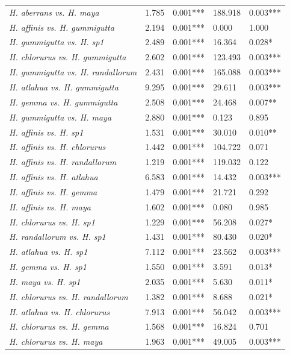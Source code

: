 \begin{xltabular}{\textwidth}{p{4.5cm}*{4}{X}}
\emph{H. aberrans vs. H. maya} & 1.785 & 0.001*** & 188.918 & 0.003*** \\
\emph{H. affinis vs. H. gummigutta} & 2.194 & 0.001*** & 0.000 & 1.000 \\
\emph{H. gummigutta vs. H. sp1} & 2.489 & 0.001*** & 16.364 & 0.028* \\
\emph{H. chlorurus vs. H. gummigutta} & 2.602 & 0.001*** & 123.493 & 0.003*** \\
\emph{H. gummigutta vs. H. randallorum} & 2.431 & 0.001*** & 165.088 & 0.003*** \\
\emph{H. atlahua vs. H. gummigutta} & 9.295 & 0.001*** & 29.611 & 0.003*** \\
\emph{H. gemma vs. H. gummigutta} & 2.508 & 0.001*** & 24.468 & 0.007** \\
\emph{H. gummigutta vs. H. maya} & 2.880 & 0.001*** & 0.123 & 0.895 \\
\emph{H. affinis vs. H. sp1} & 1.531 & 0.001*** & 30.010 & 0.010** \\
\emph{H. affinis vs. H. chlorurus} & 1.442 & 0.001*** & 104.722 & 0.071 \\
\emph{H. affinis vs. H. randallorum} & 1.219 & 0.001*** & 119.032 & 0.122 \\
\emph{H. affinis vs. H. atlahua} & 6.583 & 0.001*** & 14.432 & 0.003*** \\
\emph{H. affinis vs. H. gemma} & 1.479 & 0.001*** & 21.721 & 0.292 \\
\emph{H. affinis vs. H. maya} & 1.602 & 0.001*** & 0.080 & 0.985 \\
\emph{H. chlorurus vs. H. sp1} & 1.229 & 0.001*** & 56.208 & 0.027* \\
\emph{H. randallorum vs. H. sp1} & 1.431 & 0.001*** & 80.430 & 0.020* \\
\emph{H. atlahua vs. H. sp1} & 7.112 & 0.001*** & 23.562 & 0.003*** \\
\emph{H. gemma vs. H. sp1} & 1.550 & 0.001*** & 3.591 & 0.013* \\
\emph{H. maya vs. H. sp1} & 2.035 & 0.001*** & 5.630 & 0.011* \\
\emph{H. chlorurus vs. H. randallorum} & 1.382 & 0.001*** & 8.688 & 0.021* \\
\emph{H. atlahua vs. H. chlorurus} & 7.913 & 0.001*** & 56.042 & 0.003*** \\
\emph{H. chlorurus vs. H. gemma} & 1.568 & 0.001*** & 16.824 & 0.701 \\
\emph{H. chlorurus vs. H. maya} & 1.963 & 0.001*** & 49.005 & 0.003*** \\

\end{xltabular}

